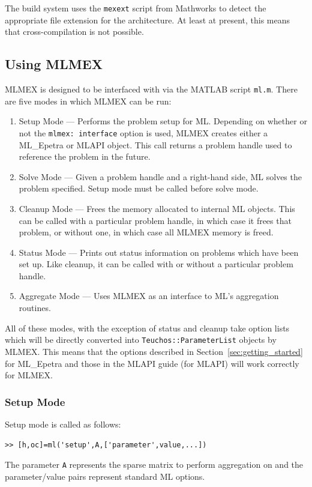 \documentclass{article}[11pt]
\begin{document}
The build system uses the \texttt{mexext} script from Mathworks to
detect the appropriate file extension for the architecture.  At least
at present, this means that cross-compilation is not possible.  


\subsection{Using MLMEX}\label{sec:mlmex:usage}
MLMEX is designed to be interfaced with via the MATLAB script
\texttt{ml.m}.  There are five modes in which MLMEX can be run:
\begin{enumerate}
\item Setup Mode --- Performs the problem setup for ML.
  Depending on whether or not the \texttt{mlmex: interface} option is
  used, MLMEX creates either a ML\_Epetra or MLAPI object.  This call
  returns a problem handle used to reference the problem in the future.
\item Solve Mode --- Given a problem handle and a right-hand side, ML
  solves the problem specified.  Setup mode must be called before
  solve mode.
\item Cleanup Mode --- Frees the memory allocated to internal ML
  objects.  This can be called with a particular problem handle, in
  which case it frees that problem, or without one, in which case all
  MLMEX memory is freed.
\item Status Mode --- Prints out status information on problems which
  have been set up.  Like cleanup, it can be called with or without a
  particular problem handle.
\item Aggregate Mode --- Uses MLMEX as an interface to ML's
  aggregation routines. 
\end{enumerate}
All of these modes, with the exception of status and cleanup take
option lists which will be directly converted into
\texttt{Teuchos::ParameterList} objects by MLMEX.  This means that 
the options described in Section~\ref{sec:getting_started} for
ML\_Epetra and those in the MLAPI guide (for MLAPI) will work
correctly for MLMEX. 

\subsubsection{Setup Mode}
Setup mode is called as follows:
\begin{verbatim}
>> [h,oc]=ml('setup',A,['parameter',value,...]) 
\end{verbatim}
The parameter \texttt{A} represents the sparse matrix to perform aggregation on
and the parameter/value pairs represent standard ML options.
\end{document}
